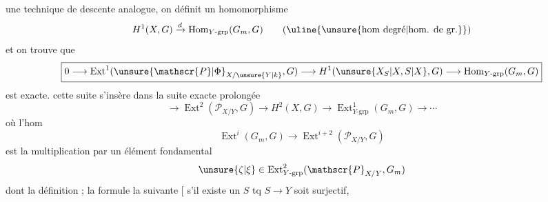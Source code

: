 {} une technique de descente analogue, on  définit {} un homomorphisme
\[
H^1(X,G)\xrightarrow{d}\operatorname{Hom}_{Y\text{-}\mathrm{grp}}(G_m,G)
\qquad (\uline{\text{{\unsure{hom degré|hom. de gr.}}}})
\]
\diagram{\begin{tikzcd}[ampersand replacement=\&]{}\arrow[r,leftrightarrow]\&{}\end{tikzcd}}
et on trouve que {}
\[
\boxed{0\longrightarrow \operatorname{Ext}^1({\unsure{\mathscr{P}|\Phi}}_{X/{\unsure{Y|k}}},G)
\longrightarrow H^1({\unsure{X_S|X,S|X}},G)
\longrightarrow\operatorname{Hom}_{Y\text{-}\mathrm{grp}}(G_m,G)}
\]
est exacte. {} cette suite s'insère dans la suite exacte prolongée
\[
\boxed{\longrightarrow\operatorname{Ext}^2(\mathscr{P}_{X/Y},G)
\longrightarrow H^2(X,G)\longrightarrow\operatorname{Ext}^1_{Y\text{-}\mathrm{grp}}(G_m,G)\longrightarrow\cdots}
\]
où {} l'hom
\[
\operatorname{Ext}^i(G_m,G)\longrightarrow\operatorname{Ext}^{i+2}(\mathscr{P}_{X/Y},G)
\]
est la multiplication par un élément fondamental
\[
{\unsure{\zeta|\xi}}\in\operatorname{Ext}^2_{Y\text{-}\mathrm{grp}}(\mathscr{P}_{X/Y},G_m)
\]
dont la définition {}; la formule {} la suivante [{} s'il existe un $S$ {} tq $S\to Y$ soit surjectif,
